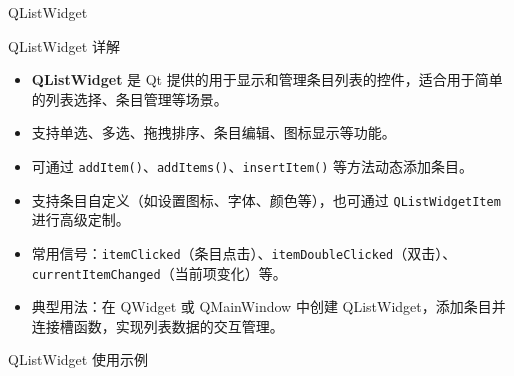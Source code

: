 \documentclass[UTF8,aspectratio=169]{beamer}
\begin{document}
\begin{frame}{QListWidget}
    \begin{ytublock}{QListWidget 详解}
        \begin{itemize}
            \item \textbf{QListWidget} 是 Qt 提供的用于显示和管理条目列表的控件，适合用于简单的列表选择、条目管理等场景。
            \item 支持单选、多选、拖拽排序、条目编辑、图标显示等功能。
            \item 可通过 \texttt{addItem()}、\texttt{addItems()}、\texttt{insertItem()} 等方法动态添加条目。
            \item 支持条目自定义（如设置图标、字体、颜色等），也可通过 \texttt{QListWidgetItem} 进行高级定制。
            \item 常用信号：\texttt{itemClicked}（条目点击）、\texttt{itemDoubleClicked}（双击）、\texttt{currentItemChanged}（当前项变化）等。
            \item 典型用法：在 QWidget 或 QMainWindow 中创建 QListWidget，添加条目并连接槽函数，实现列表数据的交互管理。
        \end{itemize}
    \end{ytublock}
\end{frame}

\begin{frame}[fragile]{QListWidget 使用示例}
    \begin{columns}
        \begin{column}{0.48\textwidth}
            \inputminted[firstline=1,lastline=15]{cpp}{code/qt_listwidget_example.cpp}
        \end{column}
        \begin{column}{0.48\textwidth}
            \inputminted[firstline=16,lastline=30]{cpp}{code/qt_listwidget_example.cpp}
        \end{column}
    \end{columns}
\end{frame}
\end{document}
